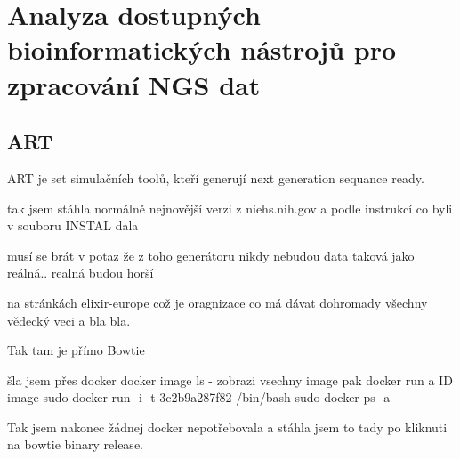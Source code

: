 \documentclass[czech,DP]{thesiskiv}
\begin{document}
\chapter{Analyza dostupných bioinformatických nástrojů pro zpracování NGS dat}

\section{ART}
ART je set simulačních toolů, kteří generují next generation sequance ready. \cite{art}


tak jsem stáhla normálně nejnovější verzi z niehs.nih.gov a podle instrukcí co byli v souboru INSTAL dala %


musí se brát v potaz že z toho generátoru nikdy nebudou data taková jako reálná.. realná budou horší 


na stránkách elixir-europe což je oragnizace co má dávat dohromady všechny vědecký veci a bla bla.

Tak tam je přímo Bowtie \cite{bowtie}

šla jsem přes docker docker image ls - zobrazi vsechny image pak docker run a ID image
sudo docker run -i -t 3c2b9a287f82 /bin/bash
sudo docker ps -a

Tak jsem nakonec žádnej docker nepotřebovala a stáhla jsem to tady %
 po kliknuti na bowtie binary release.

 
% 
%
\nocite{*}

{\raggedright\small

}
\end{document}
